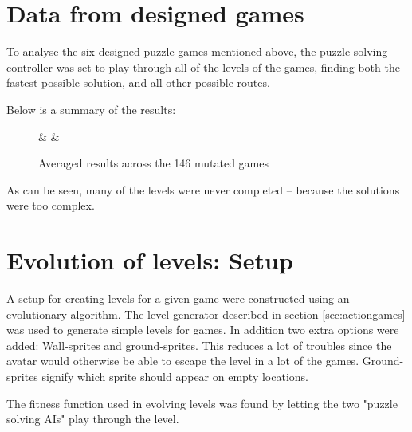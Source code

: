 \documentclass[a4paper,titlepage,final]{report}
\begin{document}
\section{Data from designed games}
\label{sec_task3data}
To analyse the six designed puzzle games mentioned above, the puzzle solving controller was set to play through all of the levels of the games, finding both the fastest possible solution, and all other possible routes.

Below is a summary of the results:

\begin{figure}[!ht]
\centering
{}%
{\Game & \Level & \Finished}%

\caption{Averaged results across the 146 mutated games}
\label{table:mutated}
\end{figure}

As can be seen, many of the levels were never completed -- because the solutions were too complex.



\section{Evolution of levels: Setup} 
\label{sec_task3evolvingLevelsSetup}
A setup for creating levels for a given game were constructed using an evolutionary algorithm. The level generator described in section \ref{sec:actiongames} was used to generate simple levels for games.  In addition two extra options were added: Wall-sprites and ground-sprites. This reduces a lot of troubles since the avatar would otherwise be able to escape the level in a lot of the games. Ground-sprites signify which sprite should appear on empty locations.

The fitness function used in evolving levels was found by letting the two "puzzle solving AIs" play through the level. 
\end{document}
